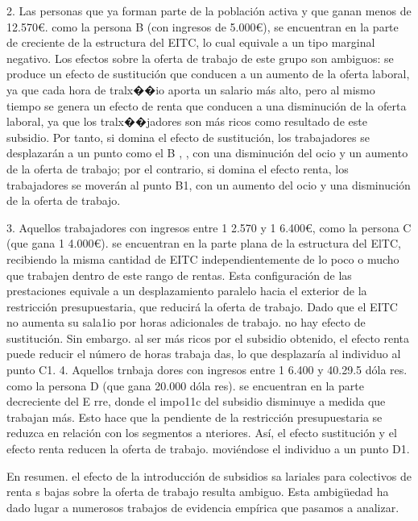 \documentclass[10pt,a4paper]{article}
\begin{document}
2. Las personas que ya forman parte de la población activa y que ganan menos de 12.570€. como la persona B (con ingresos de 5.000€), se encuentran en la parte de creciente de la estructura del EITC, lo cual equivale a un tipo marginal negativo. Los efectos sobre la oferta de trabajo de este grupo son ambiguos: se produce un efecto de sustitución que conducen a un aumento de la oferta laboral, ya que cada hora de tralx��io aporta un salario más alto, pero al mismo tiempo se genera un efecto de renta que conducen a una disminución de la oferta laboral, ya que los tralx��jadores son más ricos como resultado de este subsidio. Por tanto, si domina el efecto de sustitución, los trabajadores se desplazarán a un punto como el B , , con una disminución del ocio y un aumento de la oferta de trabajo; por el contrario, si domina el efecto renta, los trabajadores se moverán al punto B1, con un aumento del ocio y una disminución de la oferta de trabajo.

3. Aquellos trabajadores con ingresos entre 1 2.570 y 1 6.400€, como la persona C (que gana 1 4.000€). se encuentran en la parte plana de la estructura del ElTC, recibiendo la misma cantidad de EITC independientemente de lo poco o mucho que trabajen dentro de este rango de rentas. Esta configuración de las prestaciones equivale a un desplazamiento paralelo hacia el exterior de la restricción presupuestaria, que reducirá la oferta de trabajo. Dado que el EITC no aumenta su sala1io por horas adicionales de trabajo. no hay efecto de sustitución. Sin embargo. al ser más ricos por el subsidio obtenido, el efecto renta puede reducir el número de horas trabaja das, lo que desplazaría al individuo al punto C1.
4. Aquellos trnbaja dores con ingresos entre 1 6.400 y 40.29.5 dóla res. como la persona D (que gana 20.000 dóla res). se encuentran en la parte decreciente del E rre, donde el impo11c del subsidio disminuye a medida que trabajan más. Esto hace que la pendiente de la restricción presupuestaria se reduzca en relación con los segmentos a nteriores. Así, el efecto sustitución y el efecto renta reducen la oferta de trabajo. moviéndose el individuo a un punto D1. 

En resumen. el efecto de la introducción de subsidios sa lariales para colectivos de renta s bajas sobre la oferta de trabajo resulta ambiguo. Esta ambigüedad ha dado lugar a numerosos trabajos de evidencia empírica que pasamos a analizar.
\end{document}
